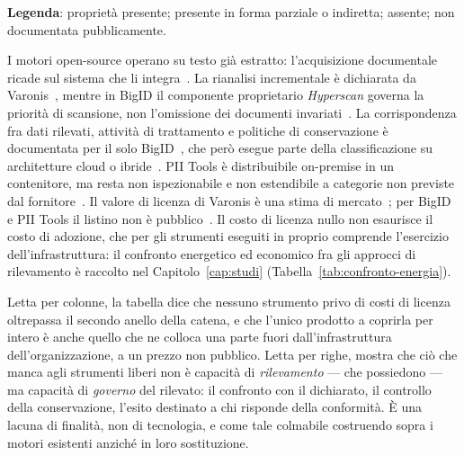 \begin{table}
	\raggedright\scriptsize
	\textbf{Legenda}: \featyes{} proprietà presente; \featpartial{} presente in forma parziale o indiretta; \featno{} assente; \featunknown{} non documentata pubblicamente.\par\vspace{0.2em}
	I motori open-source operano su testo già estratto: l'acquisizione documentale ricade sul sistema che li integra~\cite{HomeMicrosoftPresidio, zaratianaGLiNERGeneralistModel2024, LeapBeyondScrubadub2026}. La rianalisi incrementale è dichiarata da Varonis~\cite{OverviewVaronisAIPowereda}, mentre in BigID il componente proprietario \textit{Hyperscan} governa la priorità di scansione, non l'omissione dei documenti invariati~\cite{BigIDIntroducesHyperscan}. La corrispondenza fra dati rilevati, attività di trattamento e politiche di conservazione è documentata per il solo BigID~\cite{BigIDPrivacySuite}, che però esegue parte della classificazione su architetture cloud o ibride~\cite{BigIDPersonIdentification}. PII Tools è distribuibile on-premise in un contenitore, ma resta non ispezionabile e non estendibile a categorie non previste dal fornitore~\cite{PIIToolsDiscover, PIIToolsPDFPII}. Il valore di licenza di Varonis è una stima di mercato~\cite{VaronisSoftwarePricing}; per BigID e PII Tools il listino non è pubblico~\cite{BigIDDetailsReviews}. Il costo di licenza nullo non esaurisce il costo di adozione, che per gli strumenti eseguiti in proprio comprende l'esercizio dell'infrastruttura: il confronto energetico ed economico fra gli approcci di rilevamento è raccolto nel Capitolo~\ref{cap:studi} (Tabella~\ref{tab:confronto-energia}).
\end{table}

Letta per colonne, la tabella dice che nessuno strumento privo di costi di licenza oltrepassa il secondo anello della catena, e che l'unico prodotto a coprirla per intero è anche quello che ne colloca una parte fuori dall'infrastruttura dell'organizzazione, a un prezzo non pubblico. Letta per righe, mostra che ciò che manca agli strumenti liberi non è capacità di \textit{rilevamento} --- che possiedono --- ma capacità di \textit{governo} del rilevato: il confronto con il dichiarato, il controllo della conservazione, l'esito destinato a chi risponde della conformità. È una lacuna di finalità, non di tecnologia, e come tale colmabile costruendo sopra i motori esistenti anziché in loro sostituzione.

